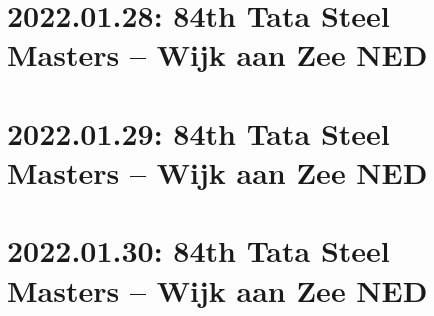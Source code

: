 \documentclass[11pt]{article}
\begin{document}

\pagebreak[4]


\pagebreak[4]


\pagebreak[4]


\pagebreak[4]


\pagebreak[4]


\pagebreak[4]

\section{2022.01.28: 84th Tata Steel Masters -- Wijk aan Zee NED}

\pagebreak[4]


\pagebreak[4]


\pagebreak[4]


\pagebreak[4]


\pagebreak[4]


\pagebreak[4]


\pagebreak[4]

\section{2022.01.29: 84th Tata Steel Masters -- Wijk aan Zee NED}

\pagebreak[4]


\pagebreak[4]


\pagebreak[4]


\pagebreak[4]


\pagebreak[4]


\pagebreak[4]


\pagebreak[4]

\section{2022.01.30: 84th Tata Steel Masters -- Wijk aan Zee NED}

\pagebreak[4]


\pagebreak[4]


\pagebreak[4]


\pagebreak[4]


\pagebreak[4]


\pagebreak[4]


\pagebreak[4]
\end{document}

